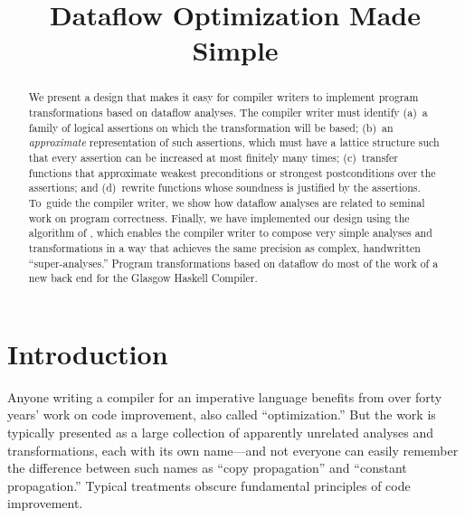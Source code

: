 \documentclass[blockstyle,preprint,nocopyrightspace]{sigplanconf}
\begin{document}
\title{Dataflow Optimization Made Simple}



\maketitle
 
\begin{abstract}
We present a design that makes it easy for compiler writers
to implement program transformations based on dataflow analyses.
The compiler writer must identify (a)~a family of logical assertions
on which the transformation will be based;
(b)~an \emph{approximate} representation of such assertions, which
must have a lattice structure such that every assertion can be increased at
most finitely many times;
(c)~transfer functions that approximate weakest preconditions or
strongest postconditions over the assertions; and
(d)~rewrite functions whose soundness is justified by the assertions.
To~guide the compiler writer,
we show how dataflow analyses are related to
seminal work on program 
correctness. 
Finally, we have implemented our design using the
algorithm of 
\citet{lerner-grove-chambers:2002}, which enables the compiler writer to
compose very simple analyses and transformations in a way that achieves
the same precision as complex, handwritten
``super-analyses.''
Program transformations based on dataflow do most of the work of a new
back end for the Glasgow Haskell Compiler.
\end{abstract}

\makeatactive   %

\section{Introduction}

Anyone writing a compiler for an imperative language benefits
from over forty years' work on code improvement, also called
``optimization.''
But the work is typically presented
as a large collection of apparently unrelated analyses and
transformations, each with its own name---and not everyone can easily
remember the difference 
between
such names as
``copy propagation'' and ``constant propagation.''
Typical treatments obscure fundamental principles of
code improvement.
\end{document}
